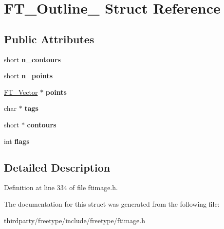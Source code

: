 \hypertarget{struct_f_t___outline__}{}\section{F\+T\+\_\+\+Outline\+\_\+ Struct Reference}
\label{struct_f_t___outline__}
\subsection*{Public Attributes}
\begin{DoxyCompactItemize}
\item 
\mbox{\label{struct_f_t___outline___a0313ba9c2c51f10e6b7d7ef97bd946e2}} 
short {\bfseries n\+\_\+contours}
\item 
\mbox{\label{struct_f_t___outline___a7ebcf3c33231af88655534d1ac02b66e}} 
short {\bfseries n\+\_\+points}
\item 
\mbox{\label{struct_f_t___outline___a4871896a2f38bdab947e30a7cf6bca04}} 
\hyperlink{struct_f_t___vector__}{F\+T\+\_\+\+Vector} $\ast$ {\bfseries points}
\item 
\mbox{\label{struct_f_t___outline___ac84ca66907361e1f49ec11c14720087a}} 
char $\ast$ {\bfseries tags}
\item 
\mbox{\label{struct_f_t___outline___a218fdea14003061142ac1045ac50affa}} 
short $\ast$ {\bfseries contours}
\item 
\mbox{\label{struct_f_t___outline___a149765f0be0eab4fc82410cf853964bf}} 
int {\bfseries flags}
\end{DoxyCompactItemize}


\subsection{Detailed Description}


Definition at line 334 of file ftimage.\+h.



The documentation for this struct was generated from the following file\+:\begin{DoxyCompactItemize}
\item 
thirdparty/freetype/include/freetype/ftimage.\+h\end{DoxyCompactItemize}
